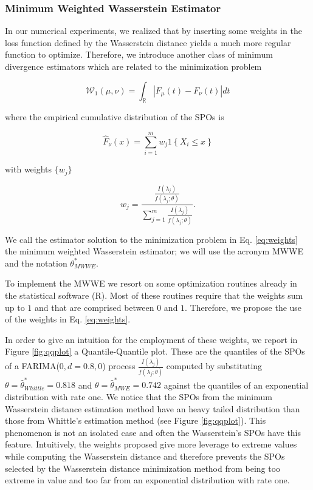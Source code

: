 \documentclass[
  11pt,
]{article}
\begin{document}
\hypertarget{minimum-weighted-wasserstein-estimator}{%
\subsubsection{Minimum Weighted Wasserstein
Estimator}\label{minimum-weighted-wasserstein-estimator}}

In our numerical experiments, we realized that by inserting some weights
in the loss function defined by the Wasserstein distance yields a much
more regular function to optimize. Therefore, we introduce another class
of minimum divergence estimators which are related to the minimization
problem

\begin{equation}
\mathcal{W}_{1}(\mu, \nu)=\int_{\mathbb{R}}\left|F_{\mu}(t)-F_{\nu}(t)\right| d t
\end{equation}

where the empirical cumulative distribution of the SPOs is

\[\hat F_\nu(x)=\sum_{i=1}^{m} w_{j} 1\left\{X_{i} \leq x\right\}\]

with weights \(\{w_j\}\)

\begin{equation}
w_j = \frac{\frac{I(\lambda_j)}{f(\lambda_j; \theta)}}{\sum^m_{j = 1}\frac{I(\lambda_j)}{f(\lambda_j; \theta)}}.
\label{eq:weights}
\end{equation}

We call the estimator solution to the minimization problem in Eq.
\ref{eq:weights} the minimum weighted Wasserstein estimator; we will use
the acronym MWWE and the notation \(\theta^*_{MWWE}\).

To implement the MWWE we resort on some optimization routines already in
the statistical software (R). Most of these routines require that the
weights sum up to \(1\) and that are comprised between \(0\) and \(1\).
Therefore, we propose the use of the weights in Eq. \ref{eq:weights}.

In order to give an intuition for the employment of these weights, we
report in Figure \ref{fig:qqplot} a Quantile-Quantile plot. These are
the quantiles of the SPOs of a FARIMA(\(0,d = 0.8,0\)) process
\(\frac{I(\lambda_j)}{f(\lambda_j; \theta)}\) computed by substituting
\(\theta = \hat \theta^*_{Whittle} = 0.818\) and
\(\theta = \hat \theta^*_{MWE} = 0.742\) against the quantiles of an
exponential distribution with rate one. We notice that the SPOs from the
minimum Wasserstein distance estimation method have an heavy tailed
distribution than those from Whittle's estimation method (see Figure
\ref{fig:qqplot}). This phenomenon is not an isolated case and often the
Wasserstein's SPOs have this feature. Intuitively, the weights proposed
give more leverage to extreme values while computing the Wasserstein
distance and therefore prevents the SPOs selected by the Wasserstein
distance minimization method from being too extreme in value and too far
from an exponential distribution with rate one.
\end{document}
